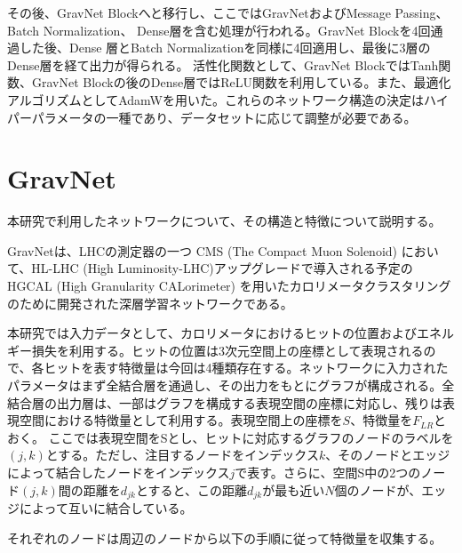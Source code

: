 その後、GravNet Blockへと移行し、ここではGravNetおよびMessage Passing、 Batch Normalization、 Dense層を含む処理が行われる。GravNet Blockを4回通過した後、Dense 層とBatch Normalizationを同様に4回適用し、最後に3層のDense層を経て出力が得られる。
活性化関数として、GravNet BlockではTanh関数、GravNet Blockの後のDense層ではReLU関数を利用している。また、最適化アルゴリズムとしてAdamWを用いた。これらのネットワーク構造の決定はハイパーパラメータの一種であり、データセットに応じて調整が必要である。


\section{GravNet}

本研究で利用したネットワークについて、その構造と特徴について説明する。

GravNet\cite{GravNet}は、LHCの測定器の一つ CMS (The Compact Muon Solenoid) において、HL-LHC (High Luminosity-LHC)アップグレードで導入される予定のHGCAL (High Granularity CALorimeter) を用いたカロリメータクラスタリングのために開発された深層学習ネットワーク\cite{GravNet_CMS}である。

本研究では入力データとして、カロリメータにおけるヒットの位置およびエネルギー損失を利用する。ヒットの位置は3次元空間上の座標として表現されるので、各ヒットを表す特徴量は今回は4種類存在する。ネットワークに入力されたパラメータはまず全結合層を通過し、その出力をもとにグラフが構成される。全結合層の出力層は、一部はグラフを構成する表現空間の座標に対応し、残りは表現空間における特徴量として利用する。表現空間上の座標を$S$、特徴量を$F_{LR}$とおく。
ここでは表現空間をSとし、ヒットに対応するグラフのノードのラベルを $(j,k)$とする。ただし、注目するノードをインデックス$k$、そのノードとエッジによって結合したノードをインデックス$j$で表す。さらに、空間S中の2つのノード$(j,k)$間の距離を$d_{jk}$とすると、この距離$d_{jk}$が最も近い$N$個のノードが、エッジによって互いに結合している。

それぞれのノードは周辺のノードから以下の手順に従って特徴量を収集する。

